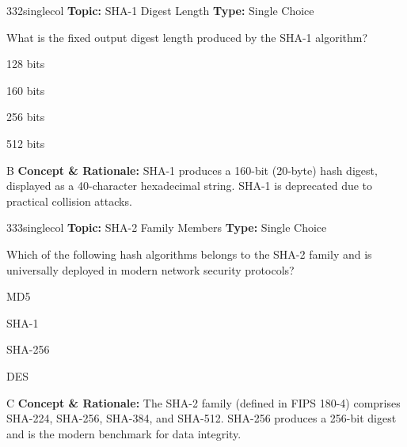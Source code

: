 \begin{qcard}{332}{singlecol}
\textcolor{darkslate!75}{\small\textbf{Topic:} SHA-1 Digest Length \hfill \textbf{Type:} Single Choice}\vspace{0.4em}\par
What is the fixed output digest length produced by the SHA-1 algorithm?
\begin{qoptions}
\item 128 bits
\item 160 bits
\item 256 bits
\item 512 bits
\end{qoptions}
\end{qcard}
\nopagebreak
\begin{explainbox}{B}
\textbf{Concept \& Rationale:} SHA-1 produces a 160-bit (20-byte) hash digest, displayed as a 40-character hexadecimal string. SHA-1 is deprecated due to practical collision attacks.
\end{explainbox}

\begin{qcard}{333}{singlecol}
\textcolor{darkslate!75}{\small\textbf{Topic:} SHA-2 Family Members \hfill \textbf{Type:} Single Choice}\vspace{0.4em}\par
Which of the following hash algorithms belongs to the SHA-2 family and is universally deployed in modern network security protocols?
\begin{qoptions}
\item MD5
\item SHA-1
\item SHA-256
\item DES
\end{qoptions}
\end{qcard}
\nopagebreak
\begin{explainbox}{C}
\textbf{Concept \& Rationale:} The SHA-2 family (defined in FIPS 180-4) comprises SHA-224, SHA-256, SHA-384, and SHA-512. SHA-256 produces a 256-bit digest and is the modern benchmark for data integrity.
\end{explainbox}

